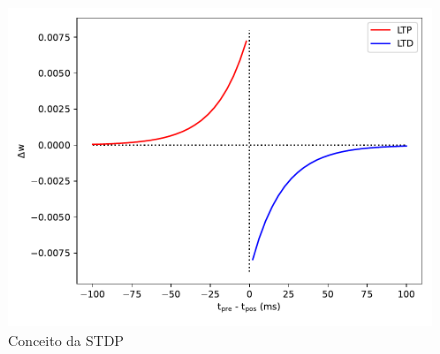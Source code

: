 \begin{figure}[htb!]
	\centering
	\caption{Conceito da STDP}
	\label{fig:stdp}
	\includegraphics[width=0.7\linewidth]{figs/stdp}
\end{figure}



